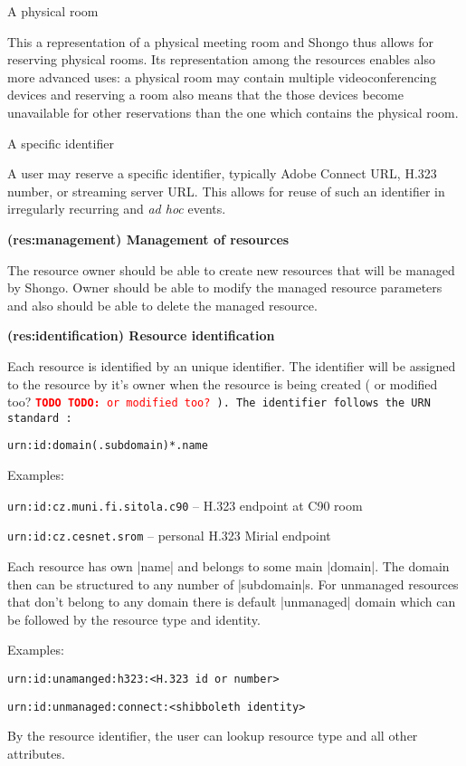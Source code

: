 \documentclass[a4paper]{report}
\makeatletter
\newcommand{\ApiValue}[1]{\verb|#1|}
\newcounter{UCcounter}
\newenvironment{UseCases}%
	{\begin{list}{\textbf{UC-\arabic{UCcounter}}}{\@nmbrlisttrue\def\@listctr{UCcounter}}}%
	{\end{list}}
\newcommand{\UClabel}[1]{\label{UC:#1}}
\newcommand{\UseCase}[2]{\item\UClabel{#2} \textbf{(#2) #1}\\ \nopagebreak}
\newcommand{\TODO}[1]{%
\def\empty{}%
\def\prvniparametr{#1}%
\ifx\prvniparametr\empty%
\begingroup\tt\textcolor{red}{\noindent\textbf{TODO}}\endgroup
\else%
\begingroup\tt\textcolor{red}{\noindent\textbf{TODO:}\ #1}\endgroup
\fi%
}
\makeatother
\begin{document}
\begin{UseCases}
\begin{compactdesc}
\item[A physical room]

This a representation of a physical meeting room and Shongo thus allows for
reserving physical rooms. Its representation among the resources enables also
more advanced uses: a physical room may contain multiple videoconferencing
devices and reserving a room also means that the those devices become
unavailable for other reservations than the one which contains the physical
room.

\item[A specific identifier]

A user may reserve a specific identifier, typically Adobe Connect URL, H.323
number, or streaming server URL. This allows for reuse of such an identifier in
irregularly recurring and \emph{ad hoc} events.

\end{compactdesc}


\UseCase{Management of resources}{res:management}

The resource owner should be able to create new resources that will be managed by Shongo. Owner should be able to modify the managed resource parameters and also should be able to delete the managed resource.

\UseCase{Resource identification}{res:identification}

Each resource is identified by an unique identifier. The identifier will be 
assigned to the resource by it's owner when the resource is being created 
(\TODO{or modified too?}). The identifier follows the URN standard \cite{rfc2141}:
\begin{verbatim}
urn:id:domain(.subdomain)*.name
\end{verbatim}
Examples: 
\begin{compactitem}
\item \ApiValue{urn:id:cz.muni.fi.sitola.c90} -- H.323 endpoint at C90 room
\item \ApiValue{urn:id:cz.cesnet.srom} -- personal H.323 Mirial endpoint
\end{compactitem}

Each resource has own |name| and belongs to some main |domain|. The domain then can be structured to any number of |subdomain|s. For unmanaged resources that don't belong to any domain there is default |unmanaged| domain which can be followed by the resource type and identity.

Examples: 
\begin{compactitem}
\item \ApiValue{urn:id:unamanged:h323:<H.323 id or number>}
\item \ApiValue{urn:id:unmanaged:connect:<shibboleth identity>}
\end{compactitem}

By the resource identifier, the user can lookup resource type and all other attributes.

\end{UseCases}
\end{document}
